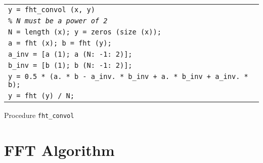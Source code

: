 \begin{listing} \begin{footnotesize}
 
 
\noindent
{\upshape
\begin{tabular}{l} \texttt{\pfunction y = fht\_convol (x, y)} \\
\texttt{\textit{\% N must be a power of 2}} \\
\texttt{N = length (x); y = zeros (size (x));} \\
\texttt{a = fht (x); b = fht (y);} \\
\texttt{a\_inv = [a (1); a (N: -1: 2)];} \\
\texttt{b\_inv = [b (1); b (N: -1: 2)];} \\
\texttt{y = 0.5 * (a. * b - a\_inv. * b\_inv + a. * b\_inv + a\_inv. * b);} \\
\texttt{y = fht (y) / N;} \\
\end{tabular}
}
 
\noindent \end{footnotesize}
 
\caption{Procedure \texttt{\upshape fht\_convol}}
 
\label{listing-fht_convol}
\end{listing}
 
\section{FFT Algorithm}
\label{sect1-listing-fft}
 
